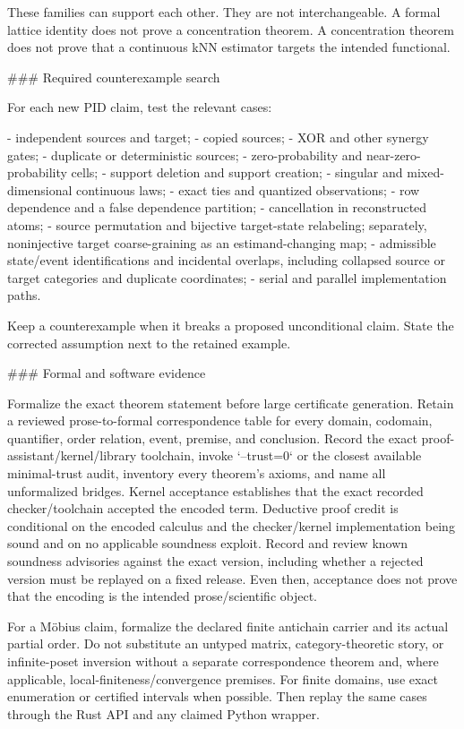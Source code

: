 \documentclass[11pt]{article}
\begin{document}
\begin{markdown}
These families can support each other. They are not interchangeable. A formal lattice identity does
not prove a concentration theorem. A concentration theorem does not prove that a continuous kNN
estimator targets the intended functional.

### Required counterexample search

For each new PID claim, test the relevant cases:

- independent sources and target;
- copied sources;
- XOR and other synergy gates;
- duplicate or deterministic sources;
- zero-probability and near-zero-probability cells;
- support deletion and support creation;
- singular and mixed-dimensional continuous laws;
- exact ties and quantized observations;
- row dependence and a false dependence partition;
- cancellation in reconstructed atoms;
- source permutation and bijective target-state relabeling; separately, noninjective target
  coarse-graining as an estimand-changing map;
- admissible state/event identifications and incidental overlaps, including collapsed source or
  target categories and duplicate coordinates;
- serial and parallel implementation paths.

Keep a counterexample when it breaks a proposed unconditional claim. State the corrected assumption
next to the retained example.

### Formal and software evidence

Formalize the exact theorem statement before large certificate generation. Retain a reviewed
prose-to-formal correspondence table for every domain, codomain, quantifier, order relation, event,
premise, and conclusion. Record the exact proof-assistant/kernel/library toolchain, invoke
`--trust=0` or the closest available minimal-trust audit, inventory every theorem's axioms, and name
all unformalized bridges. Kernel acceptance establishes that the exact recorded checker/toolchain
accepted the encoded term. Deductive proof credit is conditional on the encoded calculus and the
checker/kernel implementation being sound and on no applicable soundness exploit. Record and
review known soundness advisories against the exact version, including whether a rejected version
must be replayed on a fixed release. Even then, acceptance does not prove that the encoding is the
intended prose/scientific object.

For a Möbius claim, formalize the declared finite antichain carrier and its actual partial order.
Do not substitute an untyped matrix, category-theoretic story, or infinite-poset inversion without
a separate correspondence theorem and, where applicable, local-finiteness/convergence premises.
For finite domains, use exact enumeration or certified intervals when possible. Then replay the
same cases through the Rust API and any claimed Python wrapper.


\end{markdown}
\end{document}
